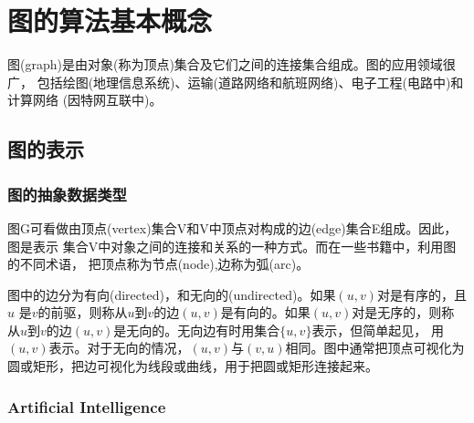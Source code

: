 


\chapter{图的算法基本概念}
\label{chap:graph-primer}

图(graph)是由对象(称为顶点)集合及它们之间的连接集合组成。图的应用领域很广，
包括绘图(地理信息系统)、运输(道路网络和航班网络)、电子工程(电路中)和计算网络
(因特网互联中)。


% 
% 
\section{图的表示}
\label{intro:sec:graph:presentation}

\subsection{图的抽象数据类型}
图G可看做由顶点(vertex)集合V和V中顶点对构成的边(edge)集合E组成。因此，图是表示
集合V中对象之间的连接和关系的一种方式。而在一些书籍中，利用图的不同术语，
把顶点称为节点(node),边称为弧(arc)。

图中的边分为有向(directed)，和无向的(undirected)。如果$(u,v)$对是有序的，且$u$
是$v$的前驱，则称从$u$到$v$的边$(u,v)$是有向的。如果$(u,v)$对是无序的，则称
从$u$到$v$的边$(u,v)$是无向的。无向边有时用集合$\{u,v\}$表示，但简单起见，
用$(u,v)$表示。对于无向的情况，$(u,v)$与$(v,u)$相同。图中通常把顶点可视化为
圆或矩形，把边可视化为线段或曲线，用于把圆或矩形连接起来。

% 
% 
\subsection{Artificial Intelligence}
\label{sec:artificial_intelligence}



